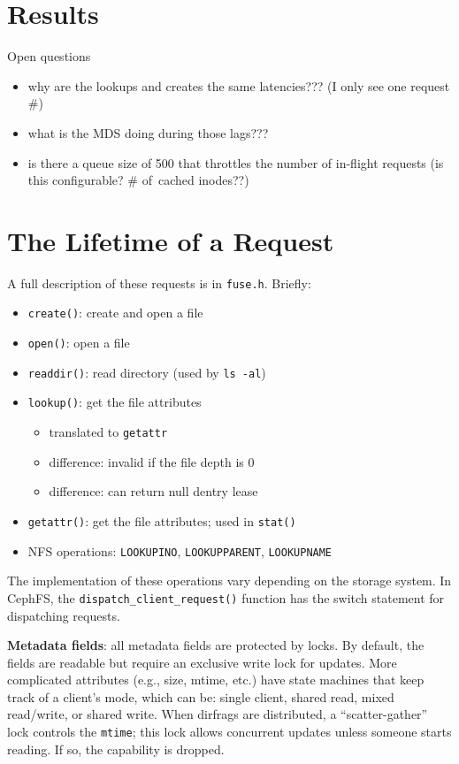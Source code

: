 \documentclass[conference]{acm_proc_article-sp} \usepackage[english]{babel}
\begin{document}
\section{Results}

\label{results}

Open questions \begin{itemize} \item why are the lookups and creates the same
latencies??? (I only see one request \#) \item what is the MDS doing during
those lags???  \item is there a queue size of 500 that throttles the number of
in-flight requests (is this configurable? \# of\ cached inodes??) \end{itemize}

\section{The Lifetime of a Request} \label{the-lifetime-of-a-request}

A full description of these requests is in \texttt{fuse.h}. Briefly:
\begin{itemize} \item \texttt{create()}: create and open a file \item
\texttt{open()}: open a file \item \texttt{readdir()}: read directory (used by
\texttt{ls -al}) \item \texttt{lookup()}: get the file attributes
\begin{itemize} \item translated to \texttt{getattr} \item difference: invalid
if the file depth is 0 \item difference: can return null dentry lease
\end{itemize} \item \texttt{getattr()}: get the file attributes; used in
\texttt{stat()} \item NFS operations: \texttt{LOOKUPINO},
\texttt{LOOKUPPARENT}, \texttt{LOOKUPNAME} \end{itemize}

The implementation of these operations vary depending on the storage system. In
CephFS, the \texttt{dispatch\_client\_request()} function has the switch
statement for dispatching requests. 

\textbf{Metadata fields}: all metadata fields are protected by locks. By
default, the fields are readable but require an exclusive write lock for
updates. More complicated attributes (e.g., size, mtime, etc.) have state
machines that keep track of a client's mode, which can be: single client,
shared read, mixed read/write, or shared write. When dirfrags are distributed,
a ``scatter-gather'' lock controls the \texttt{mtime}; this lock allows
concurrent updates unless someone starts reading. If so, the capability is
dropped.
\end{document}
